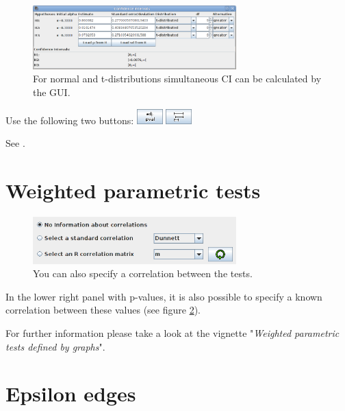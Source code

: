 \documentclass[a4paper, 11pt]{article}
\numberwithin{equation}{section}
\theoremstyle{definition}
\newtheorem{Def}{Definition}[section]
\theoremstyle{plain}
\begin{document}
\begin{figure}[ht]
  \centering    
  \includegraphics[width=0.7\textwidth]{pictures/CIDialog.png}      
  \caption{\label{CIDialog} For normal and t-distributions simultaneous CI can be calculated by the GUI.}
\end{figure}


Use the following two buttons:
\includegraphics[width=1cm]{pictures/adjPval_b.png}
\includegraphics[width=1cm]{pictures/confint2_b.png}

See \cite{Bretz11}.

\section{Weighted parametric tests}

\begin{figure}[ht]
  \centering    
  \includegraphics[width=0.7\textwidth]{pictures/correlated.png}      
  \caption{\label{correlated} You can also specify a correlation between the tests.}
\end{figure}

In the lower right panel with p-values, it is also possible to specify a known correlation between these values (see figure \ref{correlated}).
 

For further information please take a look at the vignette "\emph{Weighted parametric tests defined by graphs}".

\section{Epsilon edges}

 
\end{document}
